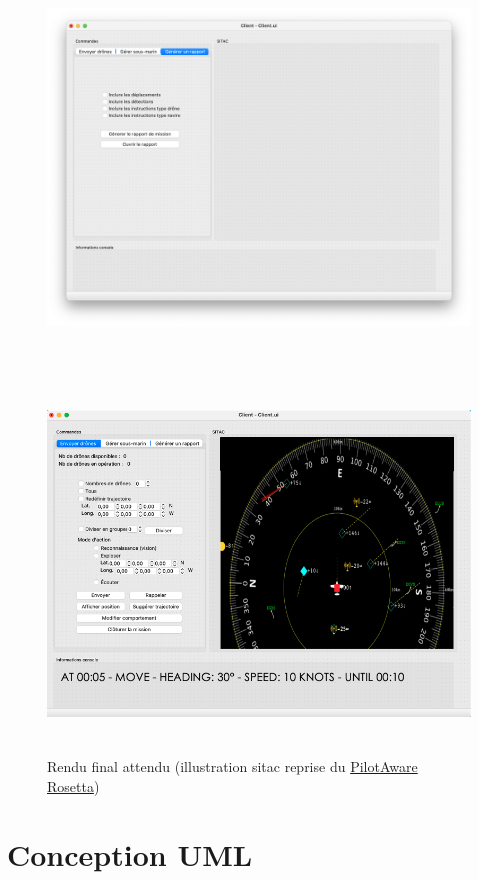 \documentclass[12pt,a4paper]{scrartcl}
\theoremstyle{plain}
\theoremstyle{definition}
\theoremstyle{remark}
\begin{document}
			\begin{figure}[H]
		\centering
		\includegraphics[height=10cm]{img/maquette/Client/ihm_client3.png} 
	\end{figure}
	
		\begin{figure}[H]
		\centering
		\includegraphics[height=10cm]{img/maquette/Client/final.png} 
		\caption{Rendu final attendu (illustration sitac reprise du \href{https://fr.pilotaware.com/post/strategic-vs-tactical-awareness}{PilotAware Rosetta})}
	\end{figure}
	
	
	\section{Conception UML}
	
	
\end{document}
